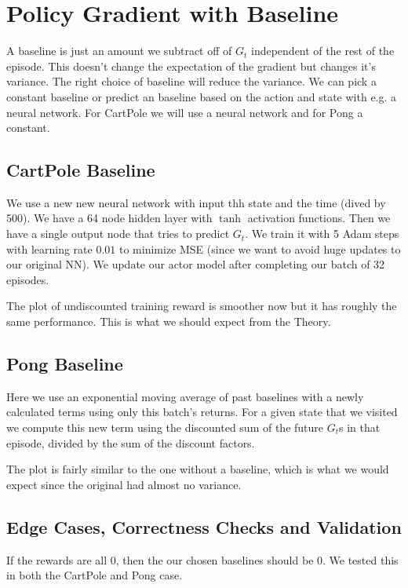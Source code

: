\documentclass{article}
\begin{document}
\subsection{}

\section{Policy Gradient with Baseline}
A baseline is just an amount we subtract off of $G_t$ independent of the rest of the episode. This doesn't change the expectation of the gradient but changes it's variance. The right choice of baseline will reduce the variance. We can pick a constant baseline or predict an baseline based on the action and state with e.g. a neural network. For CartPole we will use a neural network and for Pong a constant.

\subsection{CartPole Baseline}
We use a new new neural network with input thh state and the time (dived by 500). We have a 64 node hidden layer with $\tanh$ activation functions. Then we have a single output node that tries to predict $G_t$. We train it with 5 Adam steps with learning rate $0.01$ to minimize MSE (since we want to avoid huge updates to our original NN). We update our actor model after completing our batch of 32 episodes.

The plot of undiscounted training reward is smoother now but it has roughly the same performance. This is what we should expect from the Theory. 

\subsection{Pong Baseline}
Here we use an exponential moving average of past baselines with a newly calculated terms using only this batch's returns. For a given state that we visited we compute this new term using the discounted sum of the future $G_t$s in that episode, divided by the sum of the discount factors. 


The plot is fairly similar to the one without a baseline, which is what we would expect since the original had almost no variance.

\subsection{Edge Cases, Correctness Checks and Validation}
If the rewards are all 0, then the our chosen baselines should be 0. We tested this in both the CartPole and Pong case.
\end{document}
